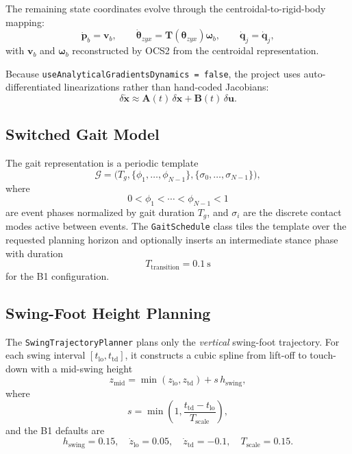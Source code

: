 \documentclass[11pt,a4paper]{article}
\newcommand{\vect}[1]{\bm{#1}}
\newcommand{\mat}[1]{\bm{#1}}
\newcommand{\code}[1]{\texttt{#1}}
\begin{document}
The remaining state coordinates evolve through the centroidal-to-rigid-body mapping:
\begin{equation}
\dot{\vect{p}}_b = \vect{v}_b, \qquad
\dot{\vect{\theta}}_{zyx} = \mat{T}(\vect{\theta}_{zyx}) \vect{\omega}_b, \qquad
\dot{\vect{q}}_j = \dot{\vect{q}}_j,
\end{equation}
with $\vect{v}_b$ and $\vect{\omega}_b$ reconstructed by OCS2 from the centroidal representation.

Because \code{useAnalyticalGradientsDynamics = false}, the project uses auto-differentiated linearizations rather than hand-coded Jacobians:
\begin{equation}
\delta \dot{\vect{x}} \approx \mat{A}(t)\,\delta \vect{x} + \mat{B}(t)\,\delta \vect{u}.
\end{equation}

\subsection{Switched Gait Model}
The gait representation is a periodic template
\begin{equation}
\mathcal{G} = \big(T_g, \{\phi_1,\ldots,\phi_{N-1}\}, \{\sigma_0,\ldots,\sigma_{N-1}\}\big),
\end{equation}
where
\begin{equation}
0 < \phi_1 < \cdots < \phi_{N-1} < 1
\end{equation}
are event phases normalized by gait duration $T_g$, and $\sigma_i$ are the discrete contact modes active between events. The \code{GaitSchedule} class tiles the template over the requested planning horizon and optionally inserts an intermediate stance phase with duration
\begin{equation}
T_{\mathrm{transition}} = 0.1~\mathrm{s}
\end{equation}
for the B1 configuration.

\subsection{Swing-Foot Height Planning}
The \code{SwingTrajectoryPlanner} plans only the \emph{vertical} swing-foot trajectory. For each swing interval $[t_{\mathrm{lo}}, t_{\mathrm{td}}]$, it constructs a cubic spline from lift-off to touch-down with a mid-swing height
\begin{equation}
z_{\mathrm{mid}} =
\min(z_{\mathrm{lo}}, z_{\mathrm{td}}) + s \, h_{\mathrm{swing}},
\end{equation}
where
\begin{equation}
s = \min \left(1,\frac{t_{\mathrm{td}} - t_{\mathrm{lo}}}{T_{\mathrm{scale}}}\right),
\end{equation}
and the B1 defaults are
\begin{equation}
h_{\mathrm{swing}} = 0.15,\quad
\dot{z}_{\mathrm{lo}} = 0.05,\quad
\dot{z}_{\mathrm{td}} = -0.1,\quad
T_{\mathrm{scale}} = 0.15.
\end{equation}
\end{document}

